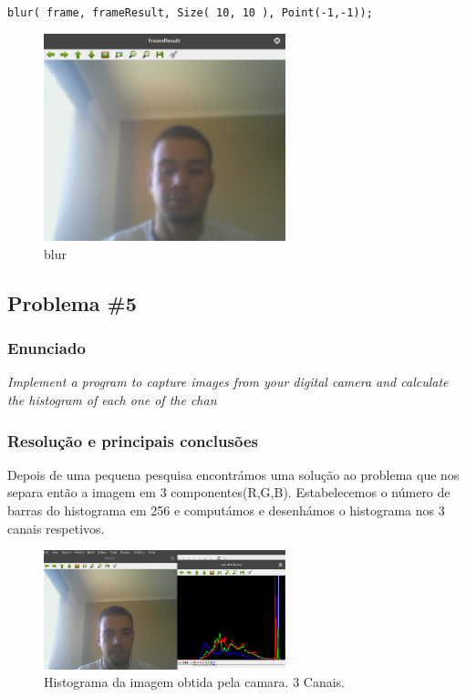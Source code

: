\documentclass[portuguese, times, mirror]{revdetua}
\begin{document}
\texttt{blur( frame, frameResult, Size( 10, 10 ), Point(-1,-1));}

\begin{figure}[ht!]
\centering
\includegraphics[width=70mm]{img/4_2.png}
\caption{blur}
\end{figure}

\newpage

\subsection{Problema \#5}

\subsubsection{Enunciado}
\textit{Implement a program to capture images from your digital camera and calculate the histogram of
each one of the chan}

\subsubsection{Resolução e principais conclusões}

Depois de uma pequena pesquisa encontrámos uma solução ao problema que nos separa então a imagem em 3 componentes(R,G,B). Estabelecemos o número de barras do histograma em 256 e computámos e desenhámos o histograma nos 3 canais respetivos.


\begin{figure}[ht!]
\centering
\includegraphics[width=70mm]{img/5_1.png}
\caption{Histograma da imagem obtida pela camara. 3 Canais. }
\end{figure}
\end{document}

